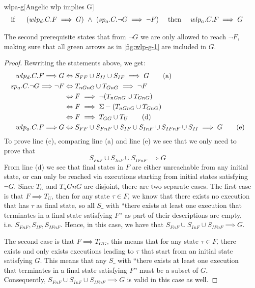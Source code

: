 \begin{lemma}{wlpa-g}[Angelic wlp implies G]
\ \\ \vspace{-3mm}
	\[\hspace{-2mm}
	\text{ if \ \ \ \ } 
	(wlp_d.C.F\implies G)
	\ \wedge\ 
	(sp_a.C.\neg G \implies \neg F) 
	\text{\ \ \ \  then\ \ \ \  } 
	wlp_a.C.F \implies G
	\] 
	\label{lem:wlp-g}
\end{lemma}
The second prerequisite  states that from $\neg G$ we are only allowed to reach $\neg F$, making sure that all green arrows as in \autoref{fig:wlp-g-1} are included in $G$. 

\renewcommand{\iff}{\Leftrightarrow}
\begin{proof}
	Rewriting the statements above, we get:
	\begin{align*} 
	wlp_d.C.F{\implies} G
	&\iff S_{FF}\cup S_{II}\cup S_{IF} \implies G \tag{a} \\
	sp_a.C.\neg G{\implies}\neg F 
	&\iff T_{nGnG}\cup T_{GnG} \implies \neg F \\ 
	&\iff F\implies \neg(T_{nGnG}\cup T_{GnG}) \\
	&\iff F\implies \S-(T_{nGnG}\cup T_{GnG}) \\
	&\iff F\implies T_{GG}\cup T_{U} \tag{d}\\
	wlp_a.C.F{\implies} G
	&\iff S_{FF}\cup S_{FnF}\cup S_{IF}\cup S_{InF}\cup S_{IFnF}\cup S_{II}  \implies G \tag{e} 
	\end{align*}
	To prove line (e), comparing line (a) and line (e) we see that we only need to prove that 
	$$S_{FnF}\cup S_{InF}\cup S_{IFnF} \implies G $$
	From line (d) we see that final states in $F$ are either unreachable from any initial state, or can only be reached via executions starting from initial states satisfying $\neg G$. 
	Since $T_U$ and ${T_nGnG}$ are disjoint, there are two separate cases. 
	The first case is that $F\implies T_{U}$, then for any state $\tau\in F$, we know that there exists no execution that has $\tau$ as final state, so all $S\_$ with ``there exists at least one execution that terminates in a final state satisfying $F$'' as part of their descriptions are empty, i.e. $S_{FnF}, S_{IF}, S_{IFnF}$. 
	Hence, in this case, we have that 
	$S_{FnF}\cup S_{InF}\cup S_{IFnF} \implies G $. 
	
	The second case is that $F\implies T_{GG}$, this means that for any state $\tau\in F$, there exists and only exists executions leading to $\tau$ that start from an initial state satisfying $G$. 
	This means that any $S\_$ with ``there exists at least one execution that terminates in a final state satisfying $F$'' must be a subset of $G$. 
	Consequently, $ S_{FnF}\cup S_{InF}\cup S_{IFnF} \implies G $ is valid in this case as well. 
\end{proof}

